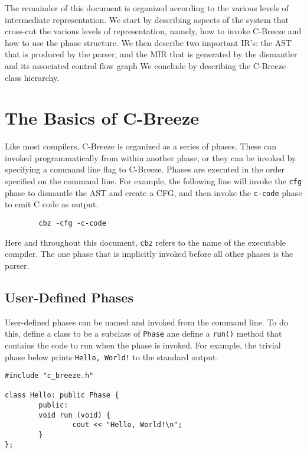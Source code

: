 \documentclass[10pt]{article}
\begin{document}
    The remainder of this document is organized according to the various
levels of intermediate representation.  We start by describing aspects of the
system that cross-cut the various levels of representation, namely, how to
invoke C-Breeze and how to use the phase structure.  We then describe two
important IR's: the AST that is produced by the parser, and the MIR that is 
generated by the dismantler and its associated control flow graph
We conclude by describing the C-Breeze class hierarchy.



\section{The Basics of C-Breeze}
\label{sec:Basics}

Like most compilers, C-Breeze is organized as a series of phases.  These can
invoked programmatically from within another phase, or they can be invoked by
specifying a command line flag to C-Breeze.  Phases are executed in the order
specified on the command line.  For example, the following line will invoke
the {\tt cfg} phase to dismantle the AST and create a CFG, and then invoke
the {\tt c-code} phase to emit C code as output.  

\begin{small}
\begin{verbatim}
        cbz -cfg -c-code
\end{verbatim}
\end{small}

\noindent
Here and throughout this document, {\tt cbz} refers to the name of the
executable compiler.  The one phase that is implicitly invoked before all
other phases is the parser.


\subsection{User-Defined Phases}

User-defined phases can be named and invoked from the command line.  To do
this, define a class to be a subclass of {\tt Phase} ane define a {\tt run()}
method that contains the code to run when the phase is invoked.  For example,
the trivial phase below prints {\tt Hello, World!} to the standard output.

\begin{small}
\begin{verbatim}
#include "c_breeze.h"

class Hello: public Phase {
        public:
        void run (void) {
                cout << "Hello, World!\n";
        }
};
\end{verbatim}
\end{small}
\end{document}
